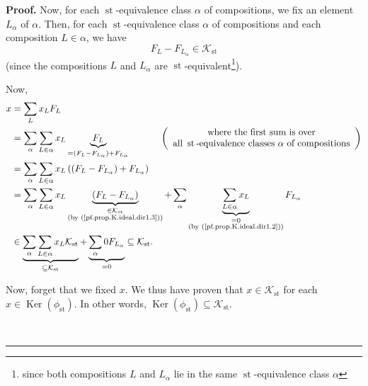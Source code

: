 \documentclass[numbers=enddot,12pt,final,onecolumn,notitlepage]{scrartcl}%
\theoremstyle{definition}
\newenvironment{proof}[1][Proof]{\noindent\textbf{#1.} }{\ \rule{0.5em}{0.5em}}
\let\sumnonlimits\sum
\renewcommand{\sum}{\sumnonlimits\limits}
\begin{document}
\begin{proof}
Now, for each $\operatorname*{st}$-equivalence class $\alpha$ of compositions,
we fix an element $L_{\alpha}$ of $\alpha$. Then, for each $\operatorname*{st}%
$-equivalence class $\alpha$ of compositions and each composition $L\in\alpha
$, we have
\begin{equation}
F_{L}-F_{L_{\alpha}}\in\mathcal{K}_{\operatorname*{st}}
\label{pf.prop.K.ideal.dir1.3}%
\end{equation}
(since the compositions $L$ and $L_{\alpha}$ are $\operatorname*{st}%
$-equivalent\footnote{since both compositions $L$ and $L_{\alpha}$ lie in the
same $\operatorname*{st}$-equivalence class $\alpha$}).

Now,%
\begin{align*}
x  &  =\sum_{L}x_{L}F_{L}\\
&  =\sum_{\alpha}\sum_{L\in\alpha}x_{L}\underbrace{F_{L}}_{=\left(
F_{L}-F_{L_{\alpha}}\right)  +F_{L_{\alpha}}}\ \ \ \ \ \ \ \ \ \ \left(
\begin{array}
[c]{c}%
\text{where the first sum is over}\\
\text{all }\operatorname*{st}\text{-equivalence classes }\alpha\text{ of
compositions}%
\end{array}
\right) \\
&  =\sum_{\alpha}\sum_{L\in\alpha}x_{L}\left(  \left(  F_{L}-F_{L_{\alpha}%
}\right)  +F_{L_{\alpha}}\right) \\
&  =\sum_{\alpha}\sum_{L\in\alpha}x_{L}\underbrace{\left(  F_{L}-F_{L_{\alpha
}}\right)  }_{\substack{\in\mathcal{K}_{\operatorname*{st}}\\\text{(by
(\ref{pf.prop.K.ideal.dir1.3}))}}}+\sum_{\alpha}\underbrace{\sum_{L\in\alpha
}x_{L}}_{\substack{=0\\\text{(by (\ref{pf.prop.K.ideal.dir1.2}))}%
}}F_{L_{\alpha}}\\
&  \in\underbrace{\sum_{\alpha}\sum_{L\in\alpha}x_{L}\mathcal{K}%
_{\operatorname*{st}}}_{\subseteq\mathcal{K}_{\operatorname*{st}}%
}+\underbrace{\sum_{\alpha}0F_{L_{\alpha}}}_{=0}\subseteq\mathcal{K}%
_{\operatorname*{st}}.
\end{align*}


Now, forget that we fixed $x$. We thus have proven that $x\in\mathcal{K}%
_{\operatorname*{st}}$ for each $x\in\operatorname*{Ker}\left(  \phi
_{\operatorname*{st}}\right)  $. In other words, $\operatorname*{Ker}\left(
\phi_{\operatorname*{st}}\right)  \subseteq\mathcal{K}_{\operatorname*{st}}$.


\end{proof}
\end{document}
